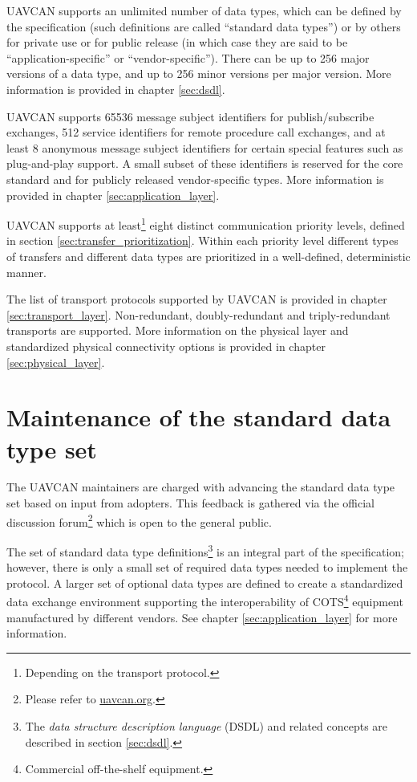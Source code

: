 UAVCAN supports an unlimited number of data types, which can be defined by the specification (such definitions
are called ``standard data types'') or by others for private use or for public release
(in which case they are said to be ``application-specific'' or ``vendor-specific'').
There can be up to 256 major versions of a data type, and up to 256 minor versions per major version.
More information is provided in chapter \ref{sec:dsdl}.

UAVCAN supports 65536 message subject identifiers for publish/subscribe exchanges,
512 service identifiers for remote procedure call exchanges,
and at least 8 anonymous message subject identifiers for certain special features such as plug-and-play support.
A small subset of these identifiers is reserved for the core standard and for publicly released vendor-specific types.
More information is provided in chapter \ref{sec:application_layer}.

UAVCAN supports at least\footnote{Depending on the transport protocol.} eight distinct communication priority levels,
defined in section \ref{sec:transfer_prioritization}.
Within each priority level different types of transfers and different data types are
prioritized in a well-defined, deterministic manner.

The list of transport protocols supported by UAVCAN is provided in chapter \ref{sec:transport_layer}.
Non-redundant, doubly-redundant and triply-redundant transports are supported.
More information on the physical layer and standardized physical connectivity options
is provided in chapter \ref{sec:physical_layer}.

\section{Maintenance of the standard data type set}

The UAVCAN maintainers are charged with advancing the standard data type set based on input from adopters.
This feedback is gathered via the official discussion
forum\footnote{Please refer to \href{http://uavcan.org}{uavcan.org}.}
which is open to the general public.

The set of standard data type definitions\footnote{The \emph{data structure description language} (DSDL) and
related concepts are described in section \ref{sec:dsdl}.} is an integral part of the specification;
however, there is only a small set of required data types needed to implement the protocol.
A larger set of optional data types are defined to create a standardized data exchange environment
supporting the interoperability of COTS\footnote{Commercial off-the-shelf equipment.}
equipment manufactured by different vendors.
See chapter \ref{sec:application_layer} for more information.

